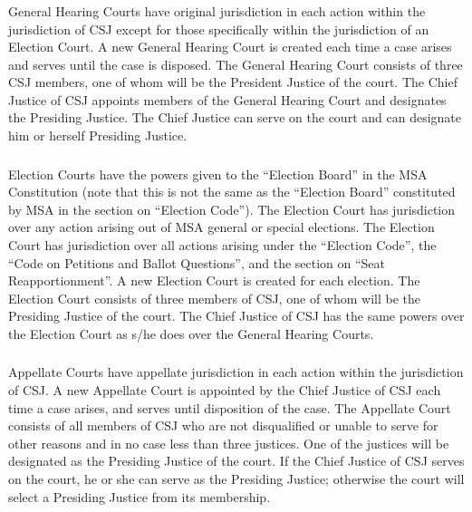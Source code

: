 \subsubsection{}
General Hearing Courts have original jurisdiction in each action within the jurisdiction of CSJ except for those specifically within the jurisdiction of an Election Court.  A new General Hearing Court is created each time a case arises and serves until the case is disposed.  The General Hearing Court consists of three CSJ members, one of whom will be the President Justice of the court.  The Chief Justice of CSJ appoints members of the General Hearing Court and designates the Presiding Justice.  The Chief Justice can serve on the court and can designate him or herself Presiding Justice.

\subsubsection{}
Election Courts have the powers given to the ``Election Board'' in the MSA Constitution (note that this is not the same as the ``Election Board'' constituted by MSA in the section on ``Election Code'').  The Election Court has jurisdiction over any action arising out of MSA general or special elections.  The Election Court has jurisdiction over all actions arising under the ``Election Code'', the ``Code on Petitions and Ballot Questions'', and the section on ``Seat Reapportionment''.  A new Election Court is created for each election.  The Election Court consists of three members of CSJ, one of whom will be the Presiding Justice of the court.  The Chief Justice of CSJ has the same powers over the Election Court as s/he does over the General Hearing Courts.

\subsubsection{}
Appellate Courts have appellate jurisdiction in each action within the jurisdiction of CSJ.  A new Appellate Court is appointed by the Chief Justice of CSJ each time a case arises, and serves until disposition of the case.  The Appellate Court consists of all members of CSJ who are not disqualified or unable to serve for other reasons and in no case less than three justices.  One of the justices will be designated as the Presiding Justice of the court.  If the Chief Justice of CSJ serves on the court, he or she can serve as the Presiding Justice; otherwise the court will select a Presiding Justice from its membership.


